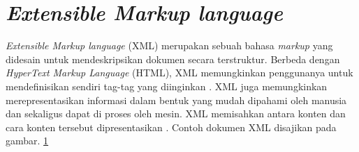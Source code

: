\section{\emph{Extensible Markup language}}
\emph{Extensible Markup language} (XML) merupakan sebuah bahasa \emph{markup} yang didesain untuk mendeskripsikan dokumen secara terstruktur. Berbeda dengan \emph{HyperText Markup Language} (HTML), XML memungkinkan penggunanya untuk mendefinisikan sendiri tag-tag yang diinginkan \citep{brietman}. XML juga memungkinkan merepresentasikan informasi dalam bentuk yang mudah dipahami oleh manusia dan sekaligus dapat di proses oleh mesin. XML memisahkan antara konten dan cara konten tersebut dipresentasikan \citep{antoniou}. Contoh dokumen XML disajikan pada gambar. \ref{}